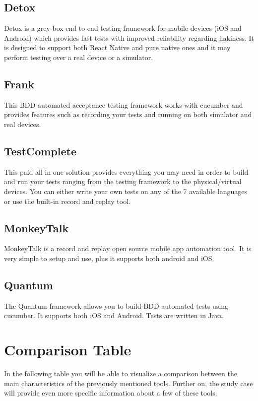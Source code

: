 \subsection {Detox}
Detox is a grey-box end to end testing framework for mobile devices (iOS and Android) which provides fast tests with improved reliability regarding flakiness. It is designed to support both React Native and pure native ones and it may perform testing over a real device or a simulator.

\subsection {Frank}
This BDD automated acceptance testing framework works with cucumber and provides features such as recording your tests and running on both simulator and real devices.

\subsection {TestComplete}
This paid all in one solution provides everything you may need in order to build and run your tests ranging from the testing framework to the physical/virtual devices. You can either write your own tests on any of the 7 available languages or use the built-in record and replay tool.

\subsection {MonkeyTalk}
MonkeyTalk is a record and replay open source mobile app automation tool. It is very simple to setup and use, plus it supports both android and iOS.

\subsection {Quantum}
The Quantum framework allows you to build BDD automated tests using cucumber. It supports both iOS and Android. Tests are written in Java.

\section{Comparison Table}
In the following table you will be able to visualize a comparison between the main characteristics of the previously mentioned tools. Further on, the study case will provide even more specific information about a few of these tools.

